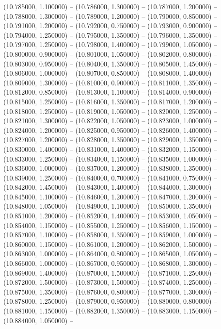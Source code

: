 (10.785000, 1.100000) -- 
(10.786000, 1.300000) -- 
(10.787000, 1.200000) -- 
(10.788000, 1.300000) -- 
(10.789000, 1.200000) -- 
(10.790000, 0.850000) -- 
(10.791000, 1.200000) -- 
(10.792000, 0.750000) -- 
(10.793000, 0.900000) -- 
(10.794000, 1.250000) -- 
(10.795000, 1.350000) -- 
(10.796000, 1.350000) -- 
(10.797000, 1.250000) -- 
(10.798000, 1.400000) -- 
(10.799000, 1.050000) -- 
(10.800000, 0.900000) -- 
(10.801000, 1.050000) -- 
(10.802000, 0.800000) -- 
(10.803000, 0.950000) -- 
(10.804000, 1.350000) -- 
(10.805000, 1.450000) -- 
(10.806000, 1.000000) -- 
(10.807000, 0.850000) -- 
(10.808000, 1.400000) -- 
(10.809000, 1.300000) -- 
(10.810000, 0.900000) -- 
(10.811000, 1.350000) -- 
(10.812000, 0.850000) -- 
(10.813000, 1.100000) -- 
(10.814000, 0.900000) -- 
(10.815000, 1.250000) -- 
(10.816000, 1.350000) -- 
(10.817000, 1.200000) -- 
(10.818000, 1.250000) -- 
(10.819000, 1.050000) -- 
(10.820000, 1.250000) -- 
(10.821000, 1.300000) -- 
(10.822000, 1.050000) -- 
(10.823000, 1.000000) -- 
(10.824000, 1.200000) -- 
(10.825000, 0.950000) -- 
(10.826000, 1.400000) -- 
(10.827000, 1.200000) -- 
(10.828000, 1.350000) -- 
(10.829000, 1.350000) -- 
(10.830000, 1.400000) -- 
(10.831000, 1.400000) -- 
(10.832000, 1.150000) -- 
(10.833000, 1.250000) -- 
(10.834000, 1.150000) -- 
(10.835000, 1.000000) -- 
(10.836000, 1.000000) -- 
(10.837000, 1.200000) -- 
(10.838000, 1.350000) -- 
(10.839000, 1.250000) -- 
(10.840000, 0.700000) -- 
(10.841000, 0.750000) -- 
(10.842000, 1.450000) -- 
(10.843000, 1.400000) -- 
(10.844000, 1.300000) -- 
(10.845000, 1.100000) -- 
(10.846000, 1.200000) -- 
(10.847000, 1.200000) -- 
(10.848000, 1.050000) -- 
(10.849000, 1.100000) -- 
(10.850000, 1.350000) -- 
(10.851000, 1.200000) -- 
(10.852000, 1.400000) -- 
(10.853000, 1.050000) -- 
(10.854000, 1.150000) -- 
(10.855000, 1.250000) -- 
(10.856000, 1.150000) -- 
(10.857000, 1.100000) -- 
(10.858000, 1.350000) -- 
(10.859000, 1.000000) -- 
(10.860000, 1.150000) -- 
(10.861000, 1.200000) -- 
(10.862000, 1.500000) -- 
(10.863000, 1.000000) -- 
(10.864000, 0.800000) -- 
(10.865000, 1.050000) -- 
(10.866000, 1.000000) -- 
(10.867000, 0.950000) -- 
(10.868000, 1.300000) -- 
(10.869000, 1.400000) -- 
(10.870000, 1.500000) -- 
(10.871000, 1.250000) -- 
(10.872000, 1.500000) -- 
(10.873000, 1.500000) -- 
(10.874000, 1.250000) -- 
(10.875000, 1.350000) -- 
(10.876000, 0.800000) -- 
(10.877000, 1.300000) -- 
(10.878000, 1.250000) -- 
(10.879000, 0.950000) -- 
(10.880000, 0.800000) -- 
(10.881000, 1.150000) -- 
(10.882000, 1.350000) -- 
(10.883000, 1.150000) -- 
(10.884000, 1.050000) -- 
